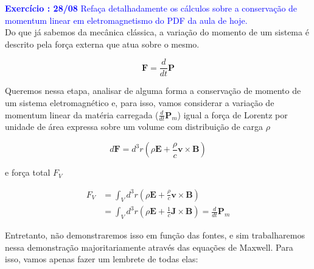\textcolor{blue}{\textbf{Exercício \paragraphnum: 28/08 }
	Refaça detalhadamente os cálculos sobre a conservação de momentum linear em eletromagnetismo do PDF da aula de hoje.}
\bigskip\\


Do que já sabemos da mecânica clássica, a variação do momento de um sistema é descrito pela força externa que atua sobre o mesmo.

\begin{equation}
	\textbf{F} = \frac{d}{dt} \textbf{P}
\end{equation}

Queremos nessa etapa, analisar de alguma forma a conservação de momento de um sistema eletromagnético e, para isso, vamos considerar a variação de momentum linear da matéria carregada ($\frac{d}{dt} \textbf{P}_m$) igual a força de Lorentz por unidade de área expressa sobre um volume com distribuição de carga $\rho$

\begin{equation}
	d \textbf{F} = d^3 r \left( \rho \textbf{E} + \frac{\rho}{c} \textbf{v} \times \textbf{B} \right)
\end{equation}

e força total $F_V$

\begin{equation}
	\begin{split}
		F_V & = \int_V d^3 r \left( \rho \textbf{E} + \frac{\rho}{c} \textbf{v} \times \textbf{B} \right) \\
		& = \int_V d^3 r \left( \rho \textbf{E} + \frac{1}{c} \textbf{J} \times \textbf{B} \right) = \frac{d}{dt} \textbf{P}_m
		\label{eq3:variacaodemomento}
	\end{split}
\end{equation}

Entretanto, não demonstraremos isso em função das fontes, e sim trabalharemos nessa demonstração majoritariamente através das equações de Maxwell. Para isso, vamos apenas fazer um lembrete de todas elas:
\\

